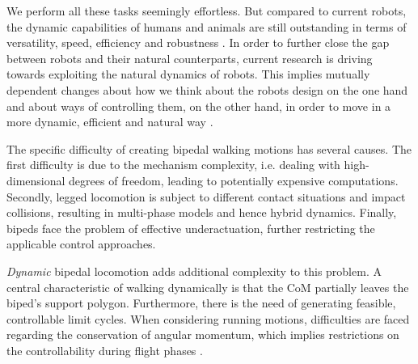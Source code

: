 We perform all these tasks seemingly effortless. But compared to current robots, the dynamic capabilities of humans and animals are still outstanding in terms of versatility, speed, efficiency and robustness \cite{hutter2012starleth}. In order to further close the gap between robots and their natural counterparts, current research is driving towards exploiting the natural dynamics of robots. This implies mutually dependent changes about how we think about the robots design \cite{pratt2004series} on the one hand and about ways of controlling them, on the other hand, in order to move in a more dynamic, efficient and natural way \cite{collins2005efficient, haddadin2012optimal, pratt2000exploiting}.

The specific difficulty of creating bipedal walking motions has several causes. The first difficulty is due to the mechanism complexity, i.e. dealing with high-dimensional degrees of freedom, leading to potentially expensive computations. Secondly, legged locomotion is subject to different contact situations and impact collisions, resulting in multi-phase models and hence hybrid dynamics. Finally, bipeds face the problem of effective underactuation, further restricting the applicable control approaches.

\textit{Dynamic} bipedal locomotion adds additional complexity to this problem. A central characteristic of walking dynamically is that the \gls{CoM} partially leaves the biped's support polygon. Furthermore, there is the need of generating feasible, controllable limit cycles. When considering running motions, difficulties are faced regarding the conservation of angular momentum, which implies restrictions on the controllability during flight phases \cite{westervelt2018feedback}. 


